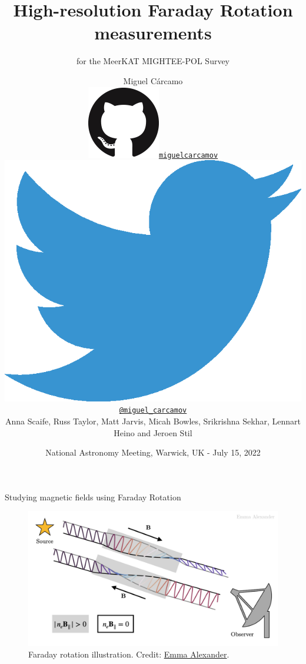\documentclass[xetex,aspectratio=169]{beamer}
\date{National Astronomy Meeting, Warwick, UK - July 15, 2022}
\title
    {High-resolution Faraday Rotation measurements}
\subtitle
    { for the MeerKAT MIGHTEE-POL Survey}
\author
    {Miguel C\'arcamo\\
    \includegraphics[scale=0.08]{figures/logos/GitHub-Mark-120px-plus.png}\hspace{0.05cm}\href{https://www.github.com/miguelcarcamov}{\tt miguelcarcamov}\\
    \includegraphics[scale=0.05]{figures/logos/2021 Twitter logo - blue.eps}\hspace{0.05cm}\href{https://www.twitter.com/miguel_carcamov}{\tt @miguel\_carcamov}\\
    \vspace{0.5cm}
    Anna Scaife, Russ Taylor, Matt Jarvis, Micah Bowles, Srikrishna Sekhar, Lennart Heino and Jeroen Stil\\
    }
\begin{document}
\frame[plain]{\titlepage}



\begin{frame}{Studying magnetic fields using Faraday Rotation}
	\begin{figure}
		\centering
		\includegraphics[width=.8\textwidth]{figures/faraday_rot.png}
		\caption*{Faraday rotation illustration. Credit: \href{https://emmaalexander.github.io/resources.html}{Emma Alexander}.}
	\end{figure}
\end{frame}
\end{document}
